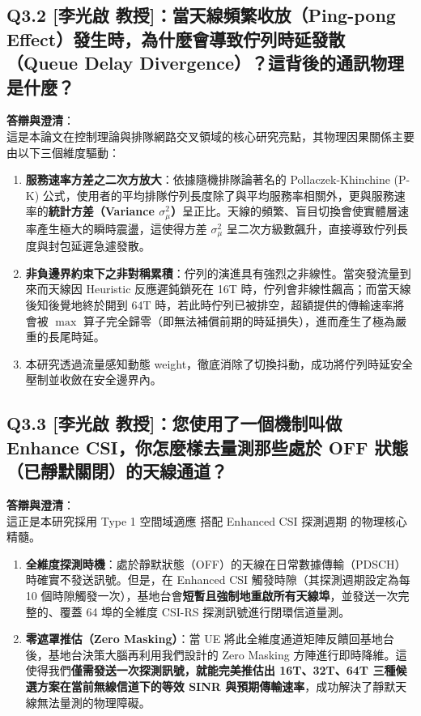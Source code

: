 \subsection*{Q3.2 [李光啟 教授]：當天線頻繁收放（Ping-pong Effect）發生時，為什麼會導致佇列時延發散（Queue Delay Divergence）？這背後的通訊物理是什麼？}
\textbf{答辯與澄清}：\\
這是本論文在控制理論與排隊網路交叉領域的核心研究亮點，其物理因果關係主要由以下三個維度驅動：
\begin{enumerate}
    \item \textbf{服務速率方差之二次方放大}：依據隨機排隊論著名的 Pollaczek-Khinchine (P-K) 公式，使用者的平均排隊佇列長度除了與平均服務率相關外，更與服務速率的\textbf{統計方差（Variance $\sigma^2_\mu$）}呈正比。天線的頻繁、盲目切換會使實體層速率產生極大的瞬時震盪，這使得方差 $\sigma^2_\mu$ 呈二次方級數飆升，直接導致佇列長度與封包延遲急遽發散。
    \item \textbf{非負邊界約束下之非對稱累積}：佇列的演進具有強烈之非線性。當突發流量到來而天線因 Heuristic 反應遲鈍鎖死在 16T 時，佇列會非線性飆高；而當天線後知後覺地終於開到 64T 時，若此時佇列已被排空，超額提供的傳輸速率將會被 $\max$ 算子完全歸零（即無法補償前期的時延損失），進而產生了極為嚴重的長尾時延。
    \item 本研究透過流量感知動態 weight，徹底消除了切換抖動，成功將佇列時延安全壓制並收斂在安全邊界內。
\end{enumerate}

\subsection*{Q3.3 [李光啟 教授]：您使用了一個機制叫做 Enhance CSI，你怎麼樣去量測那些處於 OFF 狀態（已靜默關閉）的天線通道？}
\textbf{答辯與澄清}：\\
這正是本研究採用 Type 1 空間域適應 搭配 Enhanced CSI 探測週期 的物理核心精髓。
\begin{enumerate}
    \item \textbf{全維度探測時機}：處於靜默狀態（OFF）的天線在日常數據傳輸（PDSCH）時確實不發送訊號。但是，在 Enhanced CSI 觸發時隙（其探測週期設定為每 10 個時隙觸發一次），基地台會\textbf{短暫且強制地重啟所有天線埠}，並發送一次完整的、覆蓋 64 埠的全維度 CSI-RS 探測訊號進行閉環信道量測。
    \item \textbf{零遮罩推估（Zero Masking）}：當 UE 將此全維度通道矩陣反饋回基地台後，基地台決策大腦再利用我們設計的 Zero Masking 方陣進行即時降維。這使得我們\textbf{僅需發送一次探測訊號，就能完美推估出 16T、32T、64T 三種候選方案在當前無線信道下的等效 SINR 與預期傳輸速率}，成功解決了靜默天線無法量測的物理障礙。
\end{enumerate}

